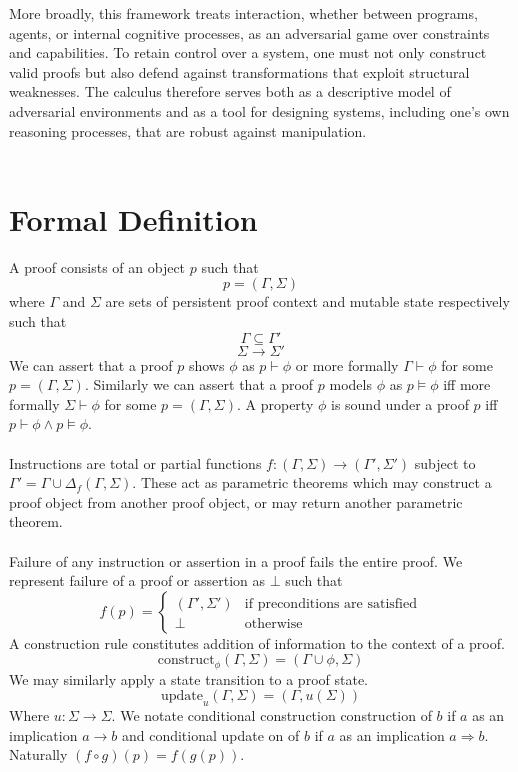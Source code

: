 \documentclass{article}
\begin{document}
	More broadly, this framework treats interaction, whether between programs, agents, or internal cognitive processes, as an adversarial game over constraints and capabilities. To retain control over a system, one must not only construct valid proofs but also defend against transformations that exploit structural weaknesses. The calculus therefore serves both as a descriptive model of adversarial environments and as a tool for designing systems, including one’s own reasoning processes, that are robust against manipulation.\\\\
	\section{Formal Definition}
	A proof consists of an object $p$ such that
	$$p = (\Gamma, \Sigma)$$
	where $\Gamma$ and $\Sigma$ are sets of persistent proof context and mutable state respectively such that
	$$\Gamma \subseteq \Gamma'$$
	$$\Sigma \rightarrow \Sigma'$$
	We can assert that a proof $p$ shows $\phi$ as $p \vdash \phi$ or more formally $\Gamma \vdash \phi$ for some $p=(\Gamma,\Sigma)$. Similarly we can assert that a proof $p$ models $\phi$ as $p \models \phi$ iff more formally $\Sigma \vdash \phi$ for some $p=(\Gamma,\Sigma)$. A property $\phi$ is sound under a proof $p$ iff $p\vdash \phi \wedge p\models \phi$.\\\\
	Instructions are total or partial functions $f : (\Gamma,\Sigma) \rightarrow (\Gamma',\Sigma')$ subject to $\Gamma'=\Gamma\cup\Delta_f(\Gamma,\Sigma)$. These act as parametric theorems which may construct a proof object from another proof object, or may return another parametric theorem.\\\\
	Failure of any instruction or assertion in a proof fails the entire proof. We represent failure of a proof or assertion as $\bot$ such that
	\[
	f(p) =
	\begin{cases}
		(\Gamma', \Sigma') & \text{if preconditions are satisfied} \\
		\bot & \text{otherwise}
	\end{cases}
	\]
	A construction rule constitutes addition of information to the context of a proof.
	$$\text{construct}_\phi(\Gamma,\Sigma) = (\Gamma\cup{\phi},\Sigma)$$
	We may similarly apply a state transition to a proof state.
	$$\text{update}_u(\Gamma,\Sigma) = (\Gamma,u(\Sigma))$$
	Where $u:\Sigma\rightarrow\Sigma$. We notate conditional construction construction of $b$ if $a$ as an implication $a \rightarrow b$ and conditional update on of $b$ if $a$ as an implication $a \Rightarrow b$.
	Naturally $(f \circ g)(p) = f(g(p))$.
\end{document}
